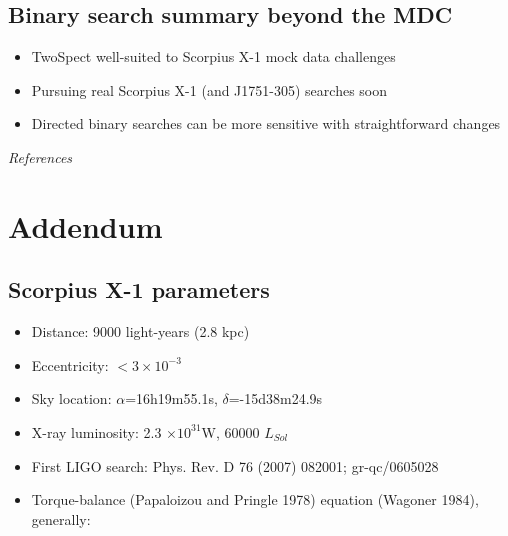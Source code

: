 \subsection{Binary search summary beyond the MDC}
\begin{itemize}
\item TwoSpect well-suited to Scorpius X-1 mock data challenges
\item Pursuing real Scorpius X-1 (and J1751-305) searches soon
\item Directed binary searches can be more sensitive with straightforward
changes
\end{itemize}







\emph{References}


\cite{Chakrabarty2003,GoetzThesis,GoetzTwoSpectMethods2011,PapaloizouPringle1978,Wagoner1984}


%
%



\section{Addendum}


\subsection{Scorpius X-1 parameters}

\begin{itemize}
\item Distance: 9000 light-years (2.8 kpc)
\item Eccentricity: $<3\times10^{-3}$
\item Sky location: $\alpha$=16h19m55.1s, $\delta$=-15d38m24.9s
\item X-ray luminosity: 2.3 $\times10^{31}$W, 60000 $L_{Sol}$
\item First LIGO search: Phys. Rev. D 76 (2007) 082001; gr-qc/0605028
\item Torque-balance (Papaloizou and Pringle 1978) equation (Wagoner 1984),
generally:
\end{itemize}

